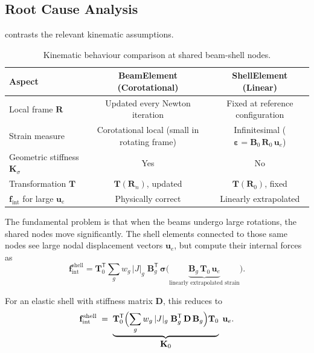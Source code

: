 \subsection{Root Cause Analysis}

 contrasts the relevant kinematic
assumptions.

\begin{table}[htbp]
\centering
\caption{Kinematic behaviour comparison at shared beam-shell nodes.}
\label{tab:kinematic-comparison}
\begin{tabular}{lcc}
\toprule
  \textbf{Aspect}
  & \textbf{BeamElement (Corotational)}
  & \textbf{ShellElement (Linear)} \\
\midrule
  Local frame $\mathbf{R}$
    & Updated every Newton iteration
    & Fixed at reference configuration \\[3pt]
  Strain measure
    & Corotational local (small in rotating frame)
    & Infinitesimal ($\bm{\varepsilon} = \mathbf{B}_0 \, \mathbf{R}_0 \, \mathbf{u}_e$) \\[3pt]
  Geometric stiffness $\mathbf{K}_\sigma$
    & Yes
    & No \\[3pt]
  Transformation $\mathbf{T}$
    & $\mathbf{T}(\mathbf{R}_n)$, updated
    & $\mathbf{T}(\mathbf{R}_0)$, fixed \\[3pt]
  $\mathbf{f}_\mathrm{int}$ for large $\mathbf{u}_e$
    & Physically correct
    & Linearly extrapolated \\
\bottomrule
\end{tabular}
\end{table}

The fundamental problem is that when the beams undergo large rotations,
the shared nodes move significantly.  The shell elements connected to
those same nodes see large nodal displacement vectors
$\mathbf{u}_e$, but compute their internal forces as
\begin{equation}\label{eq:shell-force}
  \mathbf{f}_\mathrm{int}^\mathrm{shell}
  = \mathbf{T}_0^{\mathsf{T}}
    \sum_{g} w_g \, \lvert J \rvert_g \;
    \mathbf{B}_g^{\mathsf{T}} \,
    \bm{\sigma}\!\bigl(\underbrace{\mathbf{B}_g \, \mathbf{T}_0 \, \mathbf{u}_e
      }_{\text{linearly extrapolated strain}}\bigr).
\end{equation}

For an elastic shell with stiffness matrix $\mathbf{D}$, this reduces to
\begin{equation}
  \mathbf{f}_\mathrm{int}^\mathrm{shell}
  \;=\;
  \underbrace{\mathbf{T}_0^{\mathsf{T}}
    \Bigl(\sum_g w_g \, \lvert J \rvert_g \;
    \mathbf{B}_g^{\mathsf{T}} \, \mathbf{D} \, \mathbf{B}_g\Bigr)
    \mathbf{T}_0}_{\displaystyle \mathbf{K}_0}
  \;\mathbf{u}_e.
\end{equation}


